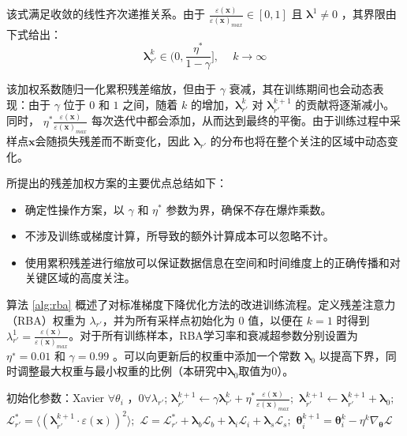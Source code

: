 该式满足收敛的线性齐次递推关系。由于 $\frac{\varepsilon(\mathbf{x})}{\varepsilon(\mathbf{x})_{max}} \in [0, 1]$ 且 $\boldsymbol{\lambda}^1\neq0$ ，其界限由下式给出：
\begin{equation}\boldsymbol{\lambda}_{r'}^k\in(0,\frac{\eta^*}{1-\gamma}],\quad \mathrm{~}k\to\infty \end{equation}

该加权系数随归一化累积残差缩放，但由于 $γ$ 衰减，其在训练期间也会动态表现：由于 $γ$ 位于 $0$ 和 $1$ 之间，随着 $k$ 的增加，$\boldsymbol{\lambda}_{r'}^k$ 对 $\boldsymbol{\lambda}_{r'}^{k+1}$ 的贡献将逐渐减小。同时， $\eta^*\frac{\varepsilon(\mathbf{x})}{\varepsilon(\mathbf{x})_{max}}$ 每次迭代中都会添加，从而达到最终的平衡。由于训练过程中采样点$\mathbf{x}$会随损失残差而不断变化，因此 $\boldsymbol{\lambda}_{r'}$ 的分布也将在整个关注的区域中动态变化。

所提出的残差加权方案的主要优点总结如下： 
\begin{itemize}
    \item 确定性操作方案，以 $\gamma$ 和 $\eta^*$ 参数为界，确保不存在爆炸乘数。 
    \item 不涉及训练或梯度计算，所导致的额外计算成本可以忽略不计。 
    \item 使用累积残差进行缩放可以保证数据信息在空间和时间维度上的正确传播和对关键区域的高度关注。
\end{itemize}

算法 \ref{alg:rba} 概述了对标准梯度下降优化方法的改进训练流程。定义残差注意力（RBA）权重为 $λ_{r'}$，并为所有采样点初始化为 $0$ 值，以便在 $k = 1$ 时得到 $λ_{r'}^1 = \frac{\varepsilon(\mathbf{x})}{\varepsilon(\mathbf{x})_{max}}$。对于所有训练样本，RBA学习率和衰减超参数分别设置为 $η^∗=0.01$ 和 $γ=0.99$ 。可以向更新后的权重中添加一个常数 $\boldsymbol{\lambda}_0$ 以提高下界，同时调整最大权重与最小权重的比例（本研究中$\boldsymbol{\lambda}_0$取值为0）。

\begin{algorithm}[h]
    \caption{基于残差注意力的梯度下降优化算法}
    \label{alg:rba}
    \begin{algorithmic}[1]
        \STATE 初始化参数：Xavier $\forall \theta_i$ ，$0 \forall λ_{r'}$;
                \STATE $\boldsymbol{\lambda}_{r'}^{k+1}\leftarrow\gamma\boldsymbol{\lambda}_{r'}^k+\eta^*\frac{\varepsilon(\mathbf{x})}{\varepsilon(\mathbf{x})_{max}};$
                \STATE $\boldsymbol{\lambda}_{r'}^{k+1}\leftarrow\boldsymbol{\lambda}_{r'}^{k+1} + \boldsymbol{\lambda}_0;$
                \STATE $\mathcal{L}_{r'}^*=\langle(\boldsymbol{\lambda}_{r'}^{k+1}\cdot \varepsilon(\mathbf{x}))^2\rangle;$
                \STATE $\mathcal{L}=\mathcal{L}_{r'}^*+\boldsymbol{\lambda}_{b}\mathcal{L}_{b}+\boldsymbol{\lambda}_{i}\mathcal{L}_{i}+\boldsymbol{\lambda}_{s}\mathcal{L}_s;$
                \STATE $\boldsymbol{\theta}_i^{k+1}=\boldsymbol{\theta}_i^{k}-\eta^{k}\nabla_{\boldsymbol{\theta}}\mathcal{L}$
            \ENDFOR
        \ENDWHILE %
    \end{algorithmic}
\end{algorithm}

